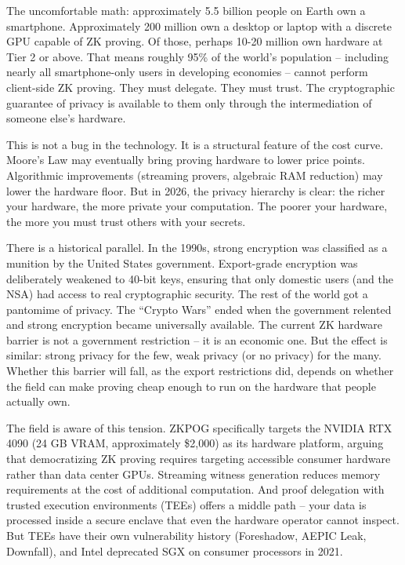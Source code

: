 \documentclass[
  11pt,
  openany]{report}
\begin{document}
The uncomfortable math: approximately 5.5 billion people on Earth own a
smartphone. Approximately 200 million own a desktop or laptop with a discrete
GPU capable of ZK proving. Of those, perhaps 10-20 million own hardware at Tier
2 or above. That means roughly 95\% of the world's population -- including
nearly all smartphone-only users in developing economies -- cannot perform
client-side ZK proving. They must delegate. They must trust. The cryptographic
guarantee of privacy is available to them only through the intermediation of
someone else's hardware.

This is not a bug in the technology. It is a structural feature of the cost
curve. Moore's Law may eventually bring proving hardware to lower price points.
Algorithmic improvements (streaming provers, algebraic RAM reduction) may lower
the hardware floor. But in 2026, the privacy hierarchy is clear: the richer your
hardware, the more private your computation. The poorer your hardware, the more
you must trust others with your secrets.

There is a historical parallel. In the 1990s, strong encryption was classified
as a munition by the United States government. Export-grade encryption was
deliberately weakened to 40-bit keys, ensuring that only domestic users (and the
NSA) had access to real cryptographic security. The rest of the world got a
pantomime of privacy. The ``Crypto Wars'' ended when the government relented and
strong encryption became universally available. The current ZK hardware barrier
is not a government restriction -- it is an economic one. But the effect is
similar: strong privacy for the few, weak privacy (or no privacy) for the many.
Whether this barrier will fall, as the export restrictions did, depends on
whether the field can make proving cheap enough to run on the hardware that
people actually own.

The field is aware of this tension. ZKPOG specifically targets the NVIDIA RTX
4090 (24 GB VRAM, approximately \$2,000) as its hardware platform, arguing that
democratizing ZK proving requires targeting accessible consumer hardware rather
than data center GPUs. Streaming witness generation reduces memory requirements
at the cost of additional computation. And proof delegation with trusted
execution environments (TEEs) offers a middle path -- your data is processed
inside a secure enclave that even the hardware operator cannot inspect. But TEEs
have their own vulnerability history (Foreshadow, AEPIC Leak, Downfall), and
Intel deprecated SGX on consumer processors in 2021.
\end{document}
